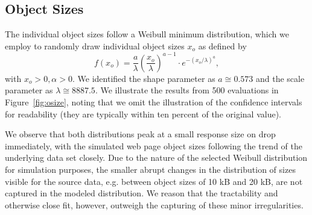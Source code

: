 \documentclass[letterpaper,conference]{IEEEtran}
\begin{document}
\subsection{Object Sizes}
The individual object sizes follow a Weibull minimum distribution, which we employ to randomly draw individual object sizes $x_o$ as defined by 
\begin{equation}\label{eq:weibull}
f\left(x_o\right) = \frac{a}{\lambda} \left(\frac{x_o}{\lambda}\right)^{a-1} \cdot e^{-(x_o/\lambda)^a}, 
\end{equation}
with $x_o>0, \alpha>0$.
We identified the shape parameter as $a \cong  0.573$ and the scale parameter as $\lambda \cong 8887.5$.
We illustrate the results from 500 evaluations in Figure~\ref{fig:osize}, noting that we omit the illustration of the confidence intervals for readability (they are typically within ten percent of the original value).


We observe that both distributions peak at a small response size on drop immediately, with the simulated web page object sizes following the trend of the underlying data set closely.
Due to the nature of the selected Weibull distribution for simulation purposes, the smaller abrupt changes in the distribution of sizes visible for the source data, e.g. between object sizes of 10 kB and 20 kB, are not captured in the modeled distribution.
We reason that the tractability and otherwise close fit, however, outweigh the capturing of these minor irregularities.
\end{document}
